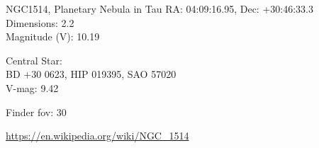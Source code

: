 \begin{block}{NGC1514, Planetary Nebula in Tau}
    RA: 04:09:16.95, Dec: +30:46:33.3 \\ 
    Dimensions: 2.2 \\ 
    Magnitude (V): 10.19


    Central Star: \\ 
      \hspace{1em}BD +30 0623, HIP 019395, SAO 57020 \\ 
      \hspace{1em}V-mag: 9.42 


    Finder fov: 30 

    \url{https://en.wikipedia.org/wiki/NGC_1514} 
\end{block}